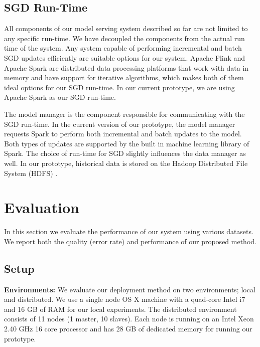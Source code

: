 \documentclass[10pt,conference,letterpaper]{IEEEtran}
\begin{document}
\subsection{SGD Run-Time} 
All components of our model serving system described so far are not limited to any specific run-time.
We have decoupled the components from the actual run time of the system.
Any system capable of performing incremental and batch SGD updates efficiently are suitable options for our system.
Apache Flink \cite{carbone2015apache} and Apache Spark \cite{zaharia2010spark} are distributed data processing platforms that work with data in memory and have support for iterative algorithms, which makes both of them ideal options for our SGD run-time.
In our current prototype, we are using Apache Spark \cite{zaharia2010spark} as our SGD run-time.

The model manager is the component responsible for communicating with the SGD run-time.
In the current version of our prototype, the model manager requests Spark to perform both incremental and batch updates to the model.
Both types of updates are supported by the built in machine learning library of Spark.
The choice of run-time for SGD slightly influences the data manager as well.
In our prototype, historical data is stored on the Hadoop Distributed File System (HDFS) \cite{shvachko2010hadoop}.

\section{Evaluation} \label{evaluation} 
In this section we evaluate the performance of our system using various datasets. 
We report both the quality (error rate) and performance of our proposed method. 

\subsection{Setup}\label{subsec:setup}
\textbf{Environments:} We evaluate our deployment method on two environments; local and distributed.
We use a single node OS X machine with  a quad-core Intel i7 and 16 GB of RAM for our local experiments.
The distributed environment consists of 11 nodes (1 master, 10 slaves).
Each node is running on an Intel Xeon 2.40 GHz 16 core processor and has 28 GB of dedicated memory for running our prototype.
\end{document}
